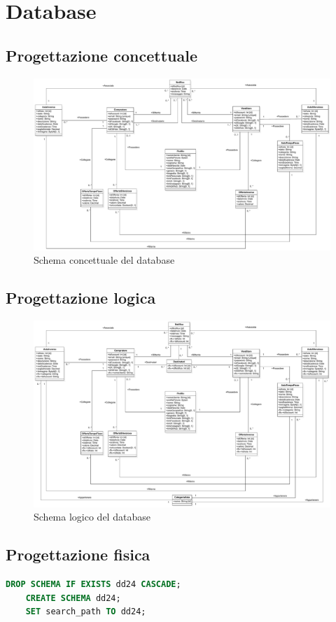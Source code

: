     \section{Database}
        \subsection{Progettazione concettuale}
            \begin{figure}[htbp!]
                \centering
                    \includegraphics[width=0.7\linewidth]{Immagini/Diagrammi/Class Diagram/ClassDiagramRistrutturato.pdf}
                \caption{Schema concettuale del database}
                \label{fig:Schema concettuale del database}
            \end{figure}
            
        \subsection{Progettazione logica}
            \begin{figure}[htbp!]
                \centering
                    \includegraphics[width=0.7\linewidth]{Immagini/Diagrammi/Class Diagram/ClassDiagramLogico.pdf}
                \caption{Schema logico del database}
                \label{fig:Schema logico del database}
            \end{figure}
        \subsection{Progettazione fisica}
\begin{lstlisting}[language=SQL, caption=Preparazione ambiente]
    DROP SCHEMA IF EXISTS dd24 CASCADE;
    CREATE SCHEMA dd24;
    SET search_path TO dd24;
\end{lstlisting}
            
